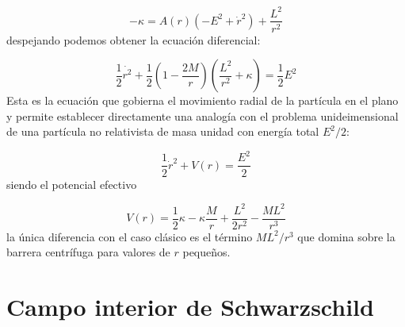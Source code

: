 \documentclass[12pt,a4paper]{book}
\numberwithin{equation}{section}
\numberwithin{figure}{section}
\newcommand{\parentesis}[1]{\left( #1  \right)}
\begin{document}
\begin{equation}
- \kappa = A(r) (-E^2+\dot{r}^2) + \frac{L^2}{r^2}
\end{equation}
despejando podemos obtener la ecuación diferencial:

\begin{equation}
\frac{1}{2} \dot{r^2} +\frac{1}{2} \parentesis{1-\frac{2M}{r}} \parentesis{\frac{L^2}{r^2}+\kappa} = \frac{1}{2} E^2
\end{equation}
Esta es la ecuación que gobierna el movimiento radial de la partícula en el plano y permite establecer directamente una analogía con el problema unideimensional de una partícula no relativista de masa unidad con energía total $E^2/2$:

\begin{equation}
\frac{1}{2} \dot{r}^2 + V(r) = \frac{E^2}{2}
\end{equation}
siendo el potencial efectivo

\begin{equation}
V(r) = \frac{1}{2} \kappa - \kappa \frac{M}{r} + \frac{L^2}{2r^2} - \frac{ML^2}{r^3}
\end{equation}
la única diferencia con el caso clásico es el término $ML^2 /r^3$ que domina sobre la barrera centrífuga para valores de $r$ pequeños. 

\newpage

\chapter{Campo interior de Schwarzschild}
\end{document}

